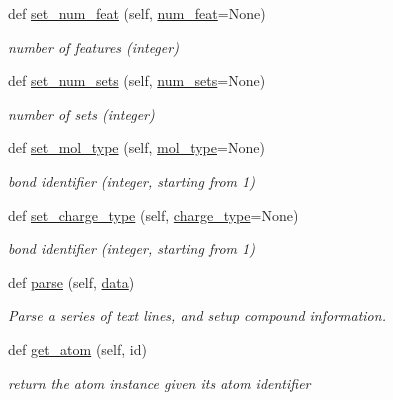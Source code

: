 \begin{DoxyCompactItemize}
def \hyperlink{classsrc_1_1Mol2_1_1mol2_a3303625224dc959c8b9e5857f42be74c}{set\+\_\+num\+\_\+feat} (self, \hyperlink{classsrc_1_1Mol2_1_1mol2_a19373b7e59f74f0e860812f7955c9784}{num\+\_\+feat}=None)
\begin{DoxyCompactList}\small\item\em number of features (integer) \end{DoxyCompactList}\item 
def \hyperlink{classsrc_1_1Mol2_1_1mol2_af026b487fca3b9bb0546233874d48aab}{set\+\_\+num\+\_\+sets} (self, \hyperlink{classsrc_1_1Mol2_1_1mol2_a9c7d152a22bdb35dba0663ab3ad7b647}{num\+\_\+sets}=None)
\begin{DoxyCompactList}\small\item\em number of sets (integer) \end{DoxyCompactList}\item 
def \hyperlink{classsrc_1_1Mol2_1_1mol2_a345314e47a25f20d1510489935b424d8}{set\+\_\+mol\+\_\+type} (self, \hyperlink{classsrc_1_1Mol2_1_1mol2_ad21515ebc6a8aab1bff8bc37568dbb8e}{mol\+\_\+type}=None)
\begin{DoxyCompactList}\small\item\em bond identifier (integer, starting from 1) \end{DoxyCompactList}\item 
def \hyperlink{classsrc_1_1Mol2_1_1mol2_a6aacaa8f96033fc7bad3080f48c5a992}{set\+\_\+charge\+\_\+type} (self, \hyperlink{classsrc_1_1Mol2_1_1mol2_a458a296ca9f8b7b690bf2c26d0488772}{charge\+\_\+type}=None)
\begin{DoxyCompactList}\small\item\em bond identifier (integer, starting from 1) \end{DoxyCompactList}\item 
def \hyperlink{classsrc_1_1Mol2_1_1mol2_a3f8091dc58267dfc193486b80c247def}{parse} (self, \hyperlink{namespacesrc_1_1Mol2_a12bf18db47042b1704de5e1fb05b2ade}{data})
\begin{DoxyCompactList}\small\item\em Parse a series of text lines, and setup compound information. \end{DoxyCompactList}\item 
def \hyperlink{classsrc_1_1Mol2_1_1mol2_a1feb64ba646d7dc2c86b608f81940373}{get\+\_\+atom} (self, id)
\begin{DoxyCompactList}\small\item\em return the atom instance given its atom identifier \end{DoxyCompactList}\item 

\end{DoxyCompactItemize}
